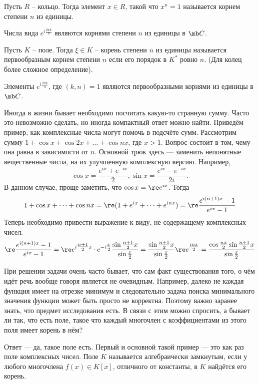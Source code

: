 \dfn Пусть $R$ -- кольцо. Тогда элемент $x\in R$, такой что $x^n=1$ называется корнем степени $n$ из единицы.
\edfn

\rm Числа вида $e^{i\frac{2\pi k}{n}}$ являются корнями степени $n$ из единицы в $\mb C$.
\erm

\dfn Пусть $K$ -- поле. Тогда $\xi\in K$ -- корень степени $n$ из единицы  называется первообразным корнем степени $n$ если его порядок в $ K^*$ ровно $n$. (Для колец более сложное определение).
\edfn

\rm Элементы $e^{i\frac{2\pi k}{n}}$, где $(k,n)=1$ являются первообразными корнями из единицы в $\mb C$.
\erm



Иногда в жизни бывает необходимо посчитать какую-то странную сумму. Часто это невозможно сделать, но иногда компактный ответ можно найти. Приведём пример, как комплексные числа могут помочь в подсчёте сумм.
Рассмотрим сумму $1+ \cos x + \cos 2x + \dots + \cos nx$, где $x > 1$. Вопрос состоит в том, чему она равна в зависимости от $n$. Основной трюк здесь --- заменить непонятные вещественные числа, на их улучшенную комплексную версию. Например, $$\cos x = \frac{e^{ix}+e^{-ix}}{2}, \sin x = \frac{e^{ix}-e^{-ix}}{2i}.$$
В данном случае, проще заметить, что $\cos x=\re e^{ix}$. Тогда
$$1 + \cos x+ \dots + \cos nx = \re(1+ e^{ix} + \dots + e^{inx}) = \re \frac{e^{i(n+1)x}-1}{e^{ix}-1}$$
Теперь необходимо привести выражение к виду, не содержащему комплексных чисел.
$$\re \frac{e^{i(n+1)x}-1}{e^{ix}-1} = \re e^{i\tfrac{n+1}{2}x}\cdot e^{-i\tfrac{x}{2}}\frac{\sin \tfrac{n+1}{2}x}{\sin\tfrac{x}{2}}=\frac{ \sin \tfrac{n+1}{2}x}{\sin\tfrac{x}{2}} \re e^{\tfrac{inx}{2}}=
\frac{\cos \tfrac{nx}{2} \sin \tfrac{n+1}{2}x}{\sin\tfrac{x}{2}}$$


При решении задачи очень часто бывает, что сам факт существования того, о чём идёт речь вообще говоря является не очевидным. Например, далеко не каждая функция имеет на отрезке минимум и следовательно задача поиска минимального значения функции может быть просто не корректна. Поэтому важно заранее знать, что предмет исследования есть.  В связи с этим можно спросить, а бывает ли так, что есть поле, такое что каждый многочлен с коэффициентами из этого поля имеет корень в нём?

Ответ — да, такое поле есть. Первый и основной такой пример --- это как раз поле комплексных чисел.
 Поле $K$ называется алгебраически замкнутым, если у любого многочлена  $f(x)\in K[x]$, отличного от константы, в $K$ найдётся его корень.
\edfn

